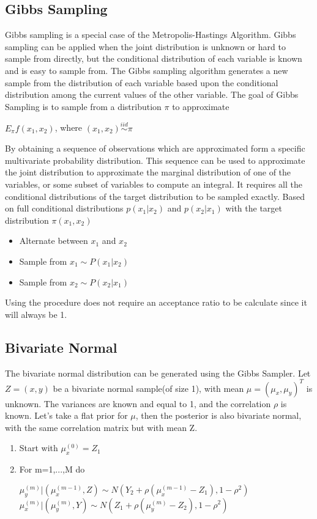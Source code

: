 \documentclass[11pt,a4paper]{article}
\theoremstyle{plain}
\begin{document}
\subsection{\bf Gibbs Sampling}
Gibbs sampling is a special case of the Metropolis-Hastings Algorithm. Gibbs sampling can be applied when the joint distribution is unknown or hard to sample from directly, but the conditional distribution of each variable is known and is easy to sample from. The Gibbs sampling algorithm generates a new sample from the distribution of each variable based upon the conditional distribution among the current values of the other variable. \newline The goal of Gibbs Sampling is to sample from a distribution $\pi$ to approximate
\begin{center}
$E_{\pi}f(x_1,x_2)$, where $(x_1,x_2)\overset{iid}\sim \pi$
\end{center}
By obtaining a sequence of observations which are approximated form a specific multivariate probability distribution.
This sequence can be used to approximate the joint distribution to approximate the marginal distribution of one of the variables, or some subset of variables to compute an integral. It requires all the conditional distributions of the target distribution to be sampled exactly. Based on full conditional distributions $p(x_1|x_2)$ and $p(x_2|x_1)$  with the target distribution $\pi(x_1,x_2)$
\begin{itemize}
  \item Alternate between $x_1$ and $x_2$
  \item Sample from $x_1 \sim P(x_1|x_2)$
  \item Sample from $x_2 \sim P(x_2|x_1)$
\end{itemize}
Using the procedure does not require an acceptance ratio to be calculate since it will  always be 1. 

\subsection*{Bivariate Normal}

The bivariate normal distribution can be generated using the Gibbs Sampler. Let $Z=(x,y)$ be a bivariate normal sample(of size 1), with mean $\mu=(\mu_x,\mu_y)^T$ is unknown. The variances are known and equal to 1, and the correlation $\rho$ is known. Let's take a flat prior for $\mu$, then the posterior is also bivariate normal, with the same correlation matrix but with mean Z. 
\begin{enumerate}
  \item Start with $\mu_x^{(0)}=Z_1$ 
  \item For m=1,...,M do
  \begin{center}
  $\mu_y^{(m)}|(\mu_x^{(m-1)},Z)\sim N(Y_2+\rho(\mu_x^{(m-1)}-Z_1),1-\rho^2)$
  \newline $\mu_x^{(m)}|(\mu_y^{(m)},Y)\sim N(Z_1+\rho(\mu_y^{(m)}-Z_2),1-\rho^2)$
  \end{center}
\end{enumerate}
\end{document}

